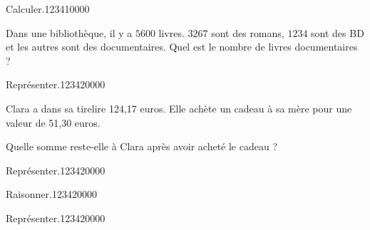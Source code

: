 \begin{pageParcoursu} 

\begin{ExoCu}{Calculer.}{1234}{1}{0}{0}{0}{0}

 Dans une bibliothèque, il y a $5600$ livres. $3267$ sont des romans, $1234$ sont des BD et les autres sont des documentaires.
 Quel est le nombre de livres documentaires ? 
\end{ExoCu}
 


\begin{ExoCu}{Représenter.}{1234}{2}{0}{0}{0}{0}

Clara a dans sa tirelire 124,17 euros. Elle achète un cadeau à sa mère pour une valeur de 51,30 euros.

Quelle somme reste-elle à Clara après avoir acheté le cadeau ? 

\end{ExoCu}
\begin{ExoCu}{Représenter.}{1234}{2}{0}{0}{0}{0}

\end{ExoCu}


\begin{ExoCu}{Raisonner.}{1234}{2}{0}{0}{0}{0}

\end{ExoCu}

\begin{ExoCu}{Représenter.}{1234}{2}{0}{0}{0}{0}


\end{ExoCu}


\end{pageParcoursu}

  



